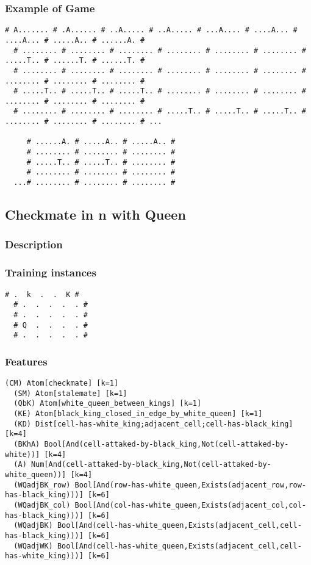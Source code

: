 \documentclass[a4paper]{article}
\begin{document}
\subsubsection{Example of Game}
\begin{Verbatim}[fontsize=\footnotesize]
  # A....... # .A...... # ..A..... # ..A..... # ...A.... # ....A... # ....A... # .....A.. # ......A. #
  # ........ # ........ # ........ # ........ # ........ # ........ # .....T.. # ......T. # ......T. #
  # ........ # ........ # ........ # ........ # ........ # ........ # ........ # ........ # ........ #
  # .....T.. # .....T.. # .....T.. # ........ # ........ # ........ # ........ # ........ # ........ #
  # ........ # ........ # ........ # .....T.. # .....T.. # .....T.. # ........ # ........ # ........ # ...

     # ......A. # .....A.. # .....A.. #
     # ........ # ........ # ........ #
     # .....T.. # .....T.. # ........ #
     # ........ # ........ # ........ #
  ...# ........ # ........ # ........ #

\end{Verbatim}


\subsection{Checkmate in n with Queen}
\subsubsection{Description}


\subsubsection{Training instances}
\begin{Verbatim}[fontsize=\footnotesize]
  # .  k  .  .  K #
  # .  .  .  .  . #
  # .  .  .  .  . #
  # Q  .  .  .  . #
  # .  .  .  .  . #
\end{Verbatim}


\subsubsection{Features}
\begin{Verbatim}[fontsize=\footnotesize]
  (CM) Atom[checkmate] [k=1]
  (SM) Atom[stalemate] [k=1]
  (QbK) Atom[white_queen_between_kings] [k=1]
  (KE) Atom[black_king_closed_in_edge_by_white_queen] [k=1]
  (KD) Dist[cell-has-white_king;adjacent_cell;cell-has-black_king] [k=4]
  (BKhA) Bool[And(cell-attaked-by-black_king,Not(cell-attaked-by-white))] [k=4]
  (A) Num[And(cell-attaked-by-black_king,Not(cell-attaked-by-white_queen))] [k=4]
  (WQadjBK_row) Bool[And(row-has-white_queen,Exists(adjacent_row,row-has-black_king)))] [k=6]
  (WQadjBK_col) Bool[And(col-has-white_queen,Exists(adjacent_col,col-has-black_king)))] [k=6]
  (WQadjBK) Bool[And(cell-has-white_queen,Exists(adjacent_cell,cell-has-black_king)))] [k=6]
  (WQadjWK) Bool[And(cell-has-white_queen,Exists(adjacent_cell,cell-has-white_king)))] [k=6]
\end{Verbatim}
\end{document}
